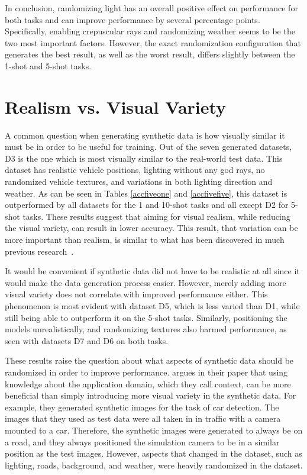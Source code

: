 In conclusion, randomizing light has an overall positive effect on performance for both tasks and can improve performance by several percentage points. Specifically, enabling crepuscular rays and randomizing weather seems to be the two most important factors. However, the exact randomization configuration that generates the best result, as well as the worst result, differs slightly between the 1-shot and 5-shot tasks.

\section{Realism vs. Visual Variety}
A common question when generating synthetic data is how visually similar it must be in order to be useful for training. Out of the seven generated datasets, D3 is the one which is most visually similar to the real-world test data. This dataset has realistic vehicle positions, lighting without any god rays, no randomized vehicle textures, and variations in both lighting direction and weather. As can be seen in Tables \ref{accfiveone} and  \ref{accfivefive}, this dataset is outperformed by all datasets for the 1 and 10-shot tasks and all except D2 for 5-shot tasks. These results suggest that aiming for visual realism, while reducing the visual variety, can result in lower accuracy. This result, that variation can be more important than realism, is similar to what has been discovered in much previous research~\cite{goodsynthetic, domainrand, domainrandcars}.

It would be convenient if synthetic data did not have to be realistic at all since it would make the data generation process easier. However, merely adding more visual variety does not correlate with improved performance either. This phenomenon is most evident with dataset D5, which is less varied than D1, while still being able to outperform it on the 5-shot tasks. Similarly, positioning the models unrealistically, and randomizing textures also harmed performance, as seen with datasets D7 and D6 on both tasks.

These results raise the question about what aspects of synthetic data should be randomized in order to improve performance. \textcite{structureddomainrandomization} argues in their paper that using knowledge about the application domain, which they call context, can be more beneficial than simply introducing more visual variety in the synthetic data. For example, they generated synthetic images for the task of car detection. The images that they used as test data were all taken in in traffic with a camera mounted to a car. Therefore, the synthetic images were generated to always be on a road, and they always positioned the simulation camera to be in a similar position as the test images. However, aspects that changed in the dataset, such as lighting, roads, background, and weather, were heavily randomized in the dataset. 

